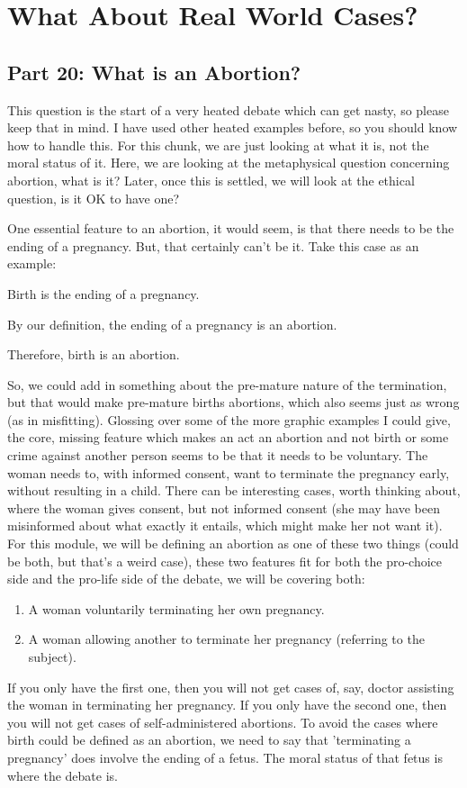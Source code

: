 \part{What About Real World Cases?}
\label{ch.modnine}

\chapter{Part 20: What is an Abortion?}

This question is the start of a very heated debate which can get nasty, so please keep that in mind. I have used other heated examples before, so you should know how to handle this. For this chunk, we are just looking at what it is, not the moral status of it. Here, we are looking at the metaphysical question concerning abortion, what is it? Later, once this is settled, we will look at the ethical question, is it OK to have one? 

One essential feature to an abortion, it would seem, is that there needs to be the ending of a pregnancy. But, that certainly can't be it. Take this case as an example:
\begin{earg}
    \item[] Birth is the ending of a pregnancy. 
    \item[] By our definition, the ending of a pregnancy is an abortion. 
    \item[Therefore,] birth is an abortion.
\end{earg}
So, we could add in something about the pre-mature nature of the termination, but that would make pre-mature births abortions, which also seems just as wrong (as in misfitting). Glossing over some of the more graphic examples I could give, the core, missing feature which makes an act an abortion and not birth or some crime against another person seems to be that it needs to be voluntary. The woman needs to, with informed consent, want to terminate the pregnancy early, without resulting in a child. There can be interesting cases, worth thinking about, where the woman gives consent, but not informed consent (she may have been misinformed about what exactly it entails, which might make her not want it).   For this module, we will be defining an abortion as one of these two things (could be both, but that's a weird case), these two features fit for both the pro-choice side and the pro-life side of the debate, we will be covering both:
\begin{enumerate}
\item A woman voluntarily terminating her own pregnancy.  	
\item A woman allowing another to terminate her pregnancy (referring to the subject).
\end{enumerate}
If you only have the first one, then you will not get cases of, say, doctor assisting the woman in terminating her pregnancy. If you only have the second one, then you will not get cases of self-administered abortions.  To avoid the cases where birth could be defined as an abortion, we need to say that 'terminating a pregnancy' does involve the ending of a fetus. The moral status of that fetus is where the debate is.  

